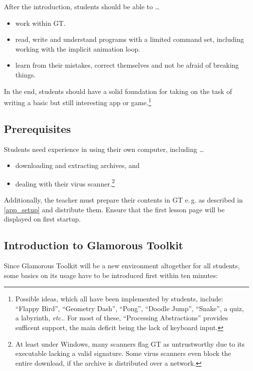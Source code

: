 After the introduction, students should be able to \dots
\begin{itemize}
\item work within \ac{GT}.
\item read, write and understand programs with a limited command set, including working with the implicit animation loop.
\item learn from their mistakes, correct themselves and not be afraid of breaking things.
\end{itemize}

In the end, students should have a solid foundation for taking on the task of writing a basic but still interesting app or game.\footnote{Possible ideas, which all have been implemented by students, include: ``Flappy Bird'', ``Geometry Dash'', ``Pong'', ``Doodle Jump'', ``Snake'', a quiz, a labyrinth, \emph{etc.}. For most of these, ``Processing Abstractions'' provides sufficent support, the main deficit being the lack of keyboard input.}


\subsection{Prerequisites}

Students need experience in using their own computer, including \dots
\begin{itemize}
\item downloading and extracting archives, and
\item dealing with their virus scanner.\footnote{At least under Windows, many scanners flag \ac{GT} as untrustworthy due to its executable lacking a valid signature. Some virus scanners even block the entire download, if the archive is distributed over a network.}
\end{itemize}

Additionally, the teacher must prepare their contents in \ac{GT} e.\,g. as described in \ref{app_setup} and distribute them. Ensure that the first lesson page will be displayed on first startup.


\subsection{Introduction to Glamorous Toolkit} \label{ssc_lesson_gt}

Since Glamorous Toolkit will be a new environment altogether for all students, some basics on its usage have to be introduced first within ten minutes:

